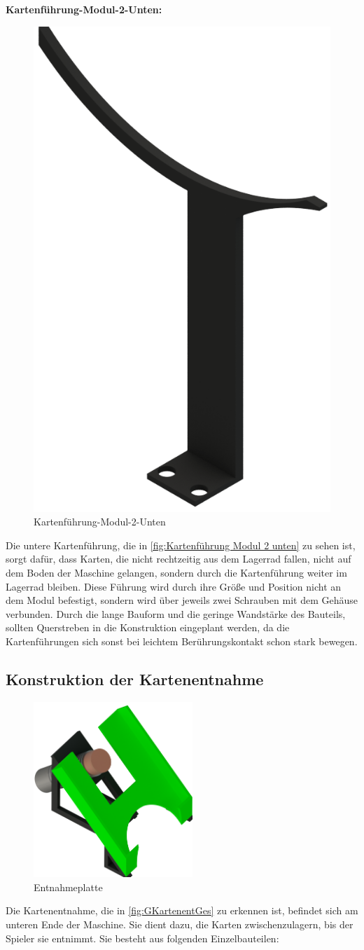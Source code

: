 \textbf{Kartenführung-Modul-2-Unten:}

\begin{figure}[H]
    \centering
    \includegraphics[width=6 cm]{fig/mech/FuehrungPLAUntenRechts}
    \caption{Kartenführung-Modul-2-Unten}
    \label{fig:Kartenführung Modul 2 unten}
\end{figure}

Die untere Kartenführung, die in \autoref{fig:Kartenführung Modul 2 unten} zu sehen ist, sorgt dafür, dass Karten, die nicht rechtzeitig aus dem Lagerrad fallen, nicht auf dem Boden der Maschine gelangen,
sondern durch die Kartenführung weiter im Lagerrad bleiben.
Diese Führung wird durch ihre Größe und Position nicht an dem Modul befestigt, sondern wird über jeweils zwei Schrauben mit dem Gehäuse
verbunden.
Durch die lange Bauform und die geringe Wandstärke des Bauteils, sollten Querstreben in die Konstruktion eingeplant werden,
da die Kartenführungen sich sonst bei leichtem Berührungskontakt schon stark bewegen.

\pagebreak
\subsection{Konstruktion der Kartenentnahme}
\begin{figure}[H]
    \centering
    \includegraphics[width = 6cm]{fig/mech/AusgabeKomlett}
    \caption{Entnahmeplatte}
    \label{fig:GKartenentGes}
\end{figure}
Die Kartenentnahme, die in \autoref{fig:GKartenentGes} zu erkennen ist, befindet sich am unteren Ende der Maschine. Sie dient dazu, die Karten zwischenzulagern, bis der Spieler
sie entnimmt. Sie besteht aus folgenden Einzelbauteilen:\\

